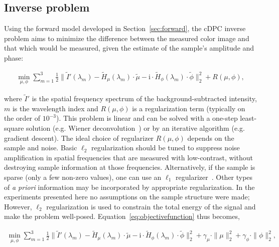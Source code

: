 \subsection{Inverse problem}
Using the forward model developed in Section~\ref{sec:forward}, the cDPC inverse problem aims to minimize the difference between the measured color image and that which would be measured, given the estimate of the sample's amplitude and phase:

\begin{equation}\label{eq:objectivefunction}
\begin{split}
\min_{\mu,\phi} \sum_{m=1}^{3}\frac{1}{2} \parallel\tilde{I}'(\lambda_m) - \tilde{H}_{\mu}(\lambda_m)\cdot \tilde{\mu} - \mathrm{i}\cdot\tilde{H}_{\phi}(\lambda_m)\cdot \tilde{\phi} \parallel_2^2 + R(\mu,\phi),
\end{split}
\end{equation}

\noindent where $\tilde{I}'$ is the spatial frequency spectrum of the background-subtracted intensity, $m$ is the wavelength index and $R(\mu,\phi)$ is a regularization term (typically on the order of $10^{-3}$). This problem is linear and can be solved with a one-step least-square solution (e.g. Wiener deconvolution~\cite{HayesDSP}) or by an iterative algorithm (e.g. gradient descent). The ideal choice of regularizer $R(\mu,\phi)$ depends on the sample and noise. Basic $\ell_2$ regularization should be tuned to suppress noise amplification in spatial frequencies that are measured with low-contrast, without destroying sample information at those frequencies. Alternatively, if the sample is sparse (only a few non-zero values), one can use an $\ell_1$ regularizer~\cite{2002_l1_sparcity}. Other types of \textit{a priori} information may be incorporated by appropriate regularization. In the experiments presented here no assumptions on the sample structure were made; However, $\ell_2$ regularization is used to constrain the total energy of the signal and make the problem well-posed. Equation~\eqref{eq:objectivefunction} thus becomes,

\begin{equation}\label{eq:objectivefunction2}
\begin{split}
\min_{\mu,\phi} \sum_{m=1}^{3} \frac{1}{2}  \parallel\tilde{I}'(\lambda_m) - \tilde{H}_{\mu}(\lambda_m)\cdot \tilde{\mu} - \mathrm{i}\cdot\tilde{H}_{\phi}(\lambda_m)\cdot \tilde{\phi} \parallel_2^2 + \gamma_\mu\cdot \parallel \mu\parallel^2_2 + \gamma_\phi\cdot \parallel \phi\parallel^2_2,
\end{split}
\end{equation}

